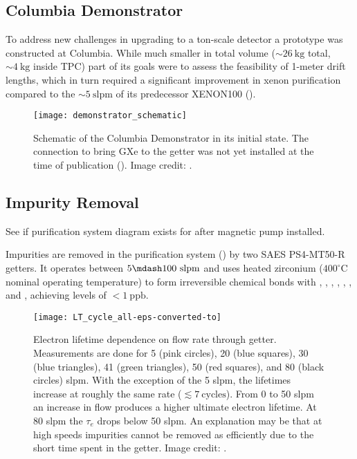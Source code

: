 \subsection{Columbia Demonstrator}
\label{subsec:electron_lifetime_model_demonstrator}
To address new challenges in upgrading to a ton-scale detector a prototype was constructed at Columbia.  While much smaller in total
volume (${\sim}26\ \mathrm{kg}$ total, ${\sim}4\ \mathrm{kg}$ inside TPC) part of its goals were to assess the feasibility of 1-meter
drift lengths, which in turn required a significant improvement in xenon purification compared to the ${\sim}5\ \mathrm{slpm}$ of its
predecessor XENON100 ().

\begin{figure}
\centering
\texttt{[image: demonstrator\_schematic]}
\caption{Schematic of the Columbia Demonstrator in its initial state.  The connection to bring GXe to the getter was not yet installed
at the time of publication ().  Image credit: .}
\label{fig:electron_lifetime_model_demonstrator_schematic}
\end{figure}



\subsection{Impurity Removal}
\label{subsec:electron_lifetime_model_removal}
See if purification system diagram exists for after magnetic pump installed.

Impurities are removed in the purification system () by two SAES PS4-MT50-R getters.  It operates between
$5 \mdash 100\ \mathrm{slpm}$ and uses heated zirconium ($400^{\circ}\mathrm{C}$ nominal operating temperature) to form irreversible
chemical bonds with , , , , , , and , achieving levels of
$< 1\ \mathrm{ppb}$.

\begin{figure}
\centering
\texttt{[image: LT\_cycle\_all-eps-converted-to]}
\caption{Electron lifetime dependence on flow rate through getter.  Measurements are done for 5 (pink circles), 20 (blue squares), 30
(blue
triangles), 41 (green triangles), 50 (red squares), and 80 (black circles) slpm.  With the exception of the 5 slpm, the lifetimes increase
at roughly the same rate ($\lesssim 7\ \mathrm{cycles}$).  From 0 to 50 slpm an increase in flow produces a higher ultimate electron
lifetime.  At 80 slpm the $\tau_e$ drops below 50 slpm.  An explanation may be that at high speeds impurities cannot be removed as
efficiently due to the short time spent in the getter.  Image credit: .}
\label{fig:electron_lifetime_model_removal_demonstrator_circ}
\end{figure}

